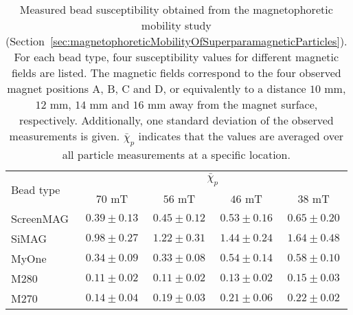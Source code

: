 \begin{table}[htb]
\begin{center}
\caption[Measured particle susceptibility at different magnet positions from the magnetophoretic mobility study]{Measured bead susceptibility obtained from the magnetophoretic mobility study (Section~\ref{sec:magnetophoreticMobilityOfSuperparamagneticParticles}). For each bead type, four susceptibility values for different magnetic fields are listed. The magnetic fields correspond to the four observed magnet positions A, B, C and D, or equivalently to a distance $10$ mm, $12$ mm, $14$ mm and $16$ mm away from the magnet surface, respectively. Additionally, one standard deviation of the observed measurements is given. $\bar{\chi}_{p}$ indicates that the values are averaged over all particle measurements at a specific location.}
\vspace{1ex}
\label{tab:particleSusceptibilityAtDifferentMagneticFieldsMobility}
\begin{tabular}{lcccc}
\hline
\multirow{2}[4]{2cm}{Bead type} & \multicolumn{4}{c}{$\bar{\chi}_{p}$} \\ 
\cmidrule{2-5}
& $70$ mT & $56$ mT & $46$ mT & $38$ mT \\
\hline
ScreenMAG 	& $0.39\pm0.13$ 	& $0.45\pm0.12$ 	& $0.53\pm0.16$ 	& $0.65\pm0.20$ \\
SiMAG 			& $0.98\pm0.27$ 	& $1.22\pm0.31$ 	& $1.44\pm0.24$ 	& $1.64\pm0.48$ \\
MyOne 			& $0.34\pm0.09$ & $0.33\pm0.08$ & $0.54\pm0.14$ & $0.58\pm0.10$ \\
M280 			& $0.11\pm0.02$ 	& $0.11\pm0.02$ 	& $0.13\pm0.02$ 	& $0.15\pm0.03$ \\
M270 			& $0.14\pm0.04$ 	& $0.19\pm0.03$ 	& $0.21\pm0.06$ 	& $0.22\pm0.02$ \\
\hline
\end{tabular}
\end{center}
\end{table}


